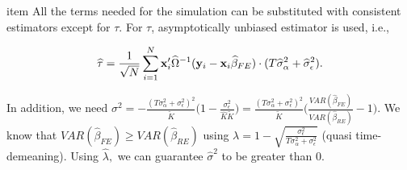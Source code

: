 item All the terms needed for the simulation can be substituted with consistent estimators except for $\tau$. For $\tau$, asymptotically unbiased estimator is used, i.e., 

\[
\widehat{\tau} = \frac{1}{\sqrt{N}} \sum_{i=1}^N \mathbf{x}_i' \widehat{\Omega}^{-1} (\mathbf{y}_i - \mathbf{x}_i\widehat{\beta}_{FE}) \cdot (T\widehat{\sigma}_\alpha^2+\widehat{\sigma}_\epsilon^2).\\
\]

In addition, we need $\sigma^2 = -\frac{(T\sigma_\alpha^2 + \sigma_\epsilon^2)^2}{\widetilde{K}} \bigg(1-\frac{\sigma_\epsilon^2}{\widehat{K}\widetilde{K}}\bigg) = \frac{(T\sigma_\alpha^2 + \sigma_\epsilon^2)^2}{\widetilde{K}} \bigg(\frac{VAR(\widehat{\beta}_{FE})}{VAR(\widehat{\beta}_{RE})}-1\bigg)$. We know that $VAR(\widehat{\beta}_{FE}) \geq VAR(\widehat{\beta}_{RE})$ using $\lambda = 1-\sqrt{\frac{\sigma_\epsilon^2}{T\sigma_\alpha^2+\sigma_\epsilon^2}}$ (quasi time-demeaning). Using $\widehat{\lambda},$ we can guarantee $\widehat{\sigma}^2$ to be greater than 0. 

